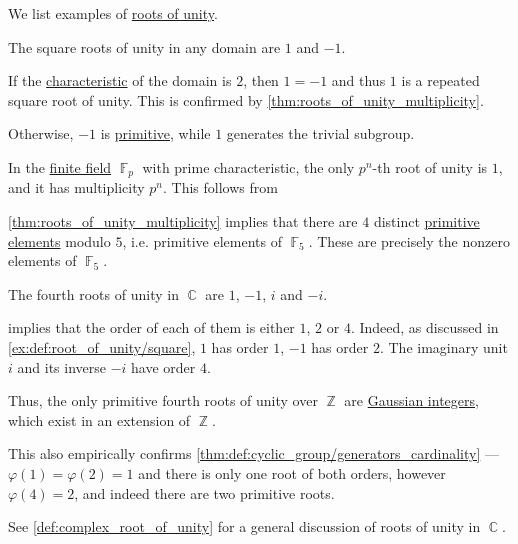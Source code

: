 \begin{example}\label{ex:def:root_of_unity}
  We list examples of \hyperref[def:root_of_unity]{roots of unity}.
  \begin{thmenum}
     The square roots of unity in any domain are \( 1 \) and \( -1 \).

    If the \hyperref[def:ring_characteristic]{characteristic} of the domain is \( 2 \), then \( 1 = -1 \) and thus \( 1 \) is a repeated square root of unity. This is confirmed by \cref{thm:roots_of_unity_multiplicity}.

    Otherwise, \( -1 \) is \hyperref[def:primitive_root_of_unity]{primitive}, while \( 1 \) generates the trivial subgroup.

     In the \hyperref[def:finite_field]{finite field} \( \BbbF_p \) with prime characteristic, the only \( p^n \)-th root of unity is \( 1 \), and it has multiplicity \( p^n \). This follows from 

     \cref{thm:roots_of_unity_multiplicity} implies that there are \( 4 \) distinct \hyperref[def:finite_field_primitive_element]{primitive elements} modulo \( 5 \), i.e. primitive elements of \( \BbbF_5 \). These are precisely the nonzero elements of \( \BbbF_5 \).

     The fourth roots of unity in \( \BbbC \) are \( 1 \), \( -1 \), \( i \) and \( -i \).

     implies that the order of each of them is either \( 1 \), \( 2 \) or \( 4 \). Indeed, as discussed in \cref{ex:def:root_of_unity/square}, \( 1 \) has order \( 1 \), \( -1 \) has order \( 2 \). The imaginary unit \( i \) and its inverse \( -i \) have order \( 4 \).

    Thus, the only primitive fourth roots of unity over \( \BbbZ \) are \hyperref[def:gaussian_integers]{Gaussian integers}, which exist in an extension of \( \BbbZ \).

    This also empirically confirms \cref{thm:def:cyclic_group/generators_cardinality} --- \( \varphi(1) = \varphi(2) = 1 \) and there is only one root of both orders, however \( \varphi(4) = 2 \), and indeed there are two primitive roots.

    See \cref{def:complex_root_of_unity} for a general discussion of roots of unity in \( \BbbC \).


\end{thmenum}
\end{example}

